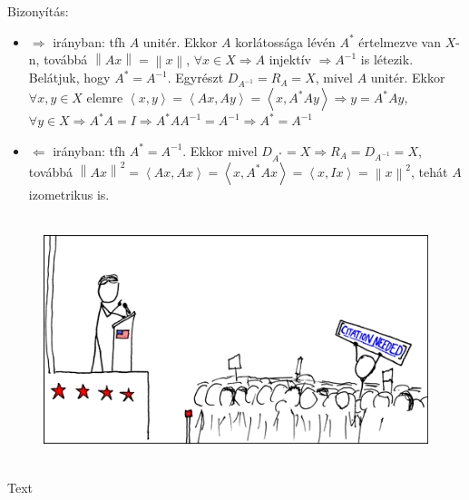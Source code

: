 \documentclass[12pt,a4paper]{scrartcl}
\providecommand{\tightlist}{%
  \setlength{\itemsep}{0pt}\setlength{\parskip}{0pt}}
\newenvironment{bizonyitas}{}{}
\newenvironment{ajanlofig}{\begin{figure}\begin{center}}{
\end{center}\end{figure}}
\begin{document}
\begin{bizonyitas}

Bizonyítás:

\begin{itemize}
\tightlist
\item
  \(\Rightarrow\) irányban: tfh \(A\) unitér. Ekkor \(A\) korlátossága
  lévén \(A^{*}\) értelmezve van \(X\)-n, továbbá
  \(\left\| {Ax} \right\| = \left\| x \right\|\),
  \(\left. \forall x \in X\Rightarrow A \right.\) injektív
  \(\left. \Rightarrow A^{- 1} \right.\) is létezik. Belátjuk, hogy
  \(A^{*} = A^{- 1}\). Egyrészt \(D_{A^{- 1}} = R_{A} = X\), mivel \(A\)
  unitér. Ekkor \(\forall x,y \in X\) elemre
  \(\left. \left\langle {x,y} \right\rangle = \left\langle {Ax,Ay} \right\rangle = \left\langle {x,A^{*}Ay} \right\rangle\Rightarrow y = A^{*}Ay \right.\),
  \(\left. \forall y \in X\Rightarrow A^{*}A = I\Rightarrow A^{*}AA^{- 1} = A^{- 1}\Rightarrow A^{*} = A^{- 1} \right.\)
\item
  \(\Leftarrow\) irányban: tfh \(A^{*} = A^{- 1}\). Ekkor mivel
  \(\left. D_{A^{*}} = X\Rightarrow R_{A} = D_{A^{- 1}} = X \right.\),
  továbbá
  \(\left\| {Ax} \right\|^{2} = \left\langle {Ax,Ax} \right\rangle = \left\langle {x,A^{*}Ax} \right\rangle = \left\langle {x,Ix} \right\rangle = \left\| x \right\|^{2}\),
  tehát \(A\) izometrikus is.
\end{itemize}

\end{bizonyitas}

\begin{ajanlo}

\begin{ajanlofig}

\href{https://xkcd.com}{\includegraphics[width=5.20833in,height=2.82292in]{wikipedian_protester.png}}

\end{ajanlofig}

Text

\end{ajanlo}
\end{document}
